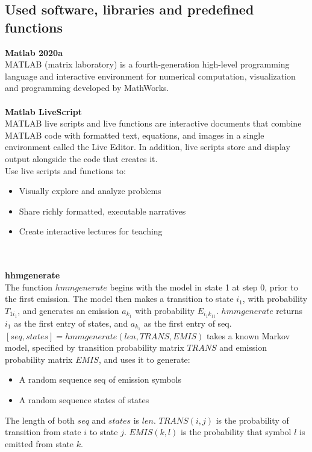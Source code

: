 \subsection{Used software, libraries and predefined functions} \label{subsec:libraries}
\textbf{Matlab 2020a}\\
MATLAB (matrix laboratory) is a fourth-generation high-level programming language and interactive environment for numerical
computation, visualization and programming developed by MathWorks.\\
\\
\textbf{Matlab LiveScript}~\cite{livescript}\\
MATLAB live scripts and live functions are interactive documents that combine MATLAB code with formatted text, equations,
and images in a single environment called the Live Editor.
In addition, live scripts store and display output alongside the code that creates it.\\
Use live scripts and functions to:\\
\begin{itemize}
    \item Visually explore and analyze problems
    \item Share richly formatted, executable narratives
    \item Create interactive lectures for teaching
\end{itemize}\\
\\
\textbf{hhmgenerate}~\cite{hhmgenerate}\\
The function $hmmgenerate$ begins with the model in state 1 at step 0, prior to the first emission.
The model then makes a transition to state $i_1$, with probability $T_{1i_1}$, and generates an emission $a_k_1$ with probability $E_{i_1k_11}$.
$hmmgenerate$ returns $i_1$ as the first entry of states, and $a_k_1$ as the first entry of seq.
$[seq,states] = hmmgenerate(len,TRANS,EMIS)$ takes a known Markov model, specified by transition probability matrix $TRANS$ and emission probability matrix $EMIS$,
and uses it to generate:\\
\begin{itemize}
    \item A random sequence seq of emission symbols
    \item A random sequence states of states
\end{itemize}
The length of both $seq$ and $states$ is $len$.
$TRANS(i,j)$ is the probability of transition from state $i$ to state $j$.
$EMIS(k,l)$ is the probability that symbol $l$ is emitted from state $k$.\\
